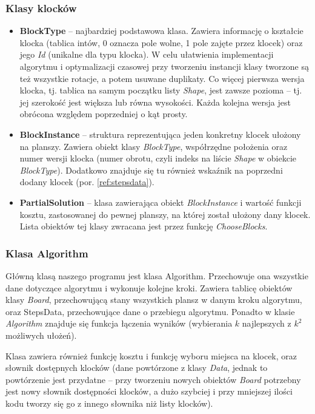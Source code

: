 \documentclass{article}
\begin{document}
\subsubsection{Klasy klocków}
\begin{itemize}
\item \textbf{BlockType} -- najbardziej podstawowa klasa. Zawiera informację o kształcie klocka (tablica intów, 0 oznacza pole wolne, 1 pole zajęte przez klocek) oraz jego \textit{Id} (unikalne dla typu klocka). W celu ułatwienia implementacji algorytmu i optymalizacji czasowej przy tworzeniu instancji klasy tworzone są też wszystkie rotacje, a potem usuwane duplikaty. Co więcej pierwsza wersja klocka, tj. tablica na samym początku listy \textit{Shape}, jest zawsze pozioma -- tj. jej szerokość jest większa lub równa wysokości. Każda kolejna wersja jest obrócona względem poprzedniej o kąt prosty.
\item \textbf{BlockInstance} -- struktura reprezentująca jeden konkretny klocek ułożony na planszy. Zawiera obiekt klasy \textit{BlockType}, współrzędne położenia oraz numer wersji klocka (numer obrotu, czyli indeks na liście \textit{Shape} w obiekcie \textit{BlockType}). Dodatkowo znajduje się tu również wskaźnik na poprzedni dodany klocek (por. \ref{ref:stepsdata}).
\item \textbf{PartialSolution} -- klasa zawierająca obiekt \textit{BlockInstance} i wartość funkcji kosztu, zastosowanej do pewnej planszy, na której został ułożony dany klocek. Lista obiektów tej klasy zwracana jest przez funkcję \textit{ChooseBlocks}.
\end{itemize}


\subsubsection{Klasa Algorithm}
Główną klasą naszego programu jest klasa Algorithm. Przechowuje ona wszystkie dane dotyczące algorytmu i wykonuje kolejne kroki. Zawiera tablicę obiektów klasy \textit{Board}, przechowującą stany wszystkich plansz w danym kroku algorytmu, oraz StepsData, przechowujące dane o przebiegu algorytmu. Ponadto w klasie \textit{Algorithm} znajduje się funkcja łączenia wyników (wybierania $k$ najlepszych z $k^2$ możliwych ułożeń).

Klasa zawiera również funkcję kosztu i funkcję wyboru miejsca na klocek, oraz słownik dostępnych klocków (dane powtórzone z klasy \textit{Data}, jednak to powtórzenie jest przydatne -- przy tworzeniu nowych obiektów \textit{Board} potrzebny jest nowy słownik dostępności klocków, a dużo szybciej i przy mniejszej ilości kodu tworzy się go z innego słownika niż listy klocków).
\end{document}

